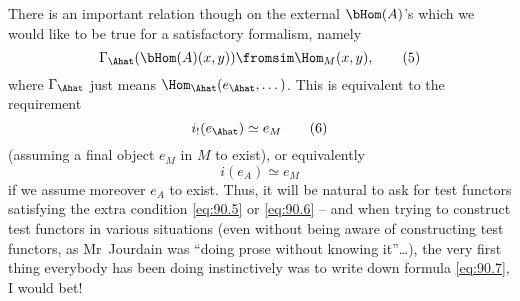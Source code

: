 There is an important relation though on the external $\bHom(A)$'s
which we would like to be true for a satisfactory formalism, namely
\begin{equation}
  \label{eq:90.5}
  \Gamma_\Ahat(\bHom(A)(x,y)) \fromsim \Hom_M(x,y),\tag{5}
\end{equation}
where $\Gamma_\Ahat$ just means $\Hom_\Ahat(e_\Ahat,\dots)$. This is
equivalent to the requirement
\begin{equation}
  \label{eq:90.6}
  i_!(e_\Ahat)\simeq e_M\tag{6}
\end{equation}
(assuming a final object $e_M$ in $M$ to exist), or equivalently
\begin{equation}
  \label{eq:90.7}
  i(e_A)\simeq e_M\tag{7}
\end{equation}
if we assume moreover $e_A$ to exist. Thus, it will be natural to ask
for test functors satisfying the extra condition \eqref{eq:90.5} or
\eqref{eq:90.6} -- and when trying to construct test functors in
various situations (even without being aware of constructing test
functors, as Mr~Jourdain was ``doing prose without knowing
it''\ldots), the very first thing everybody has been doing
instinctively was to write down formula \eqref{eq:90.7}, I
would bet!

